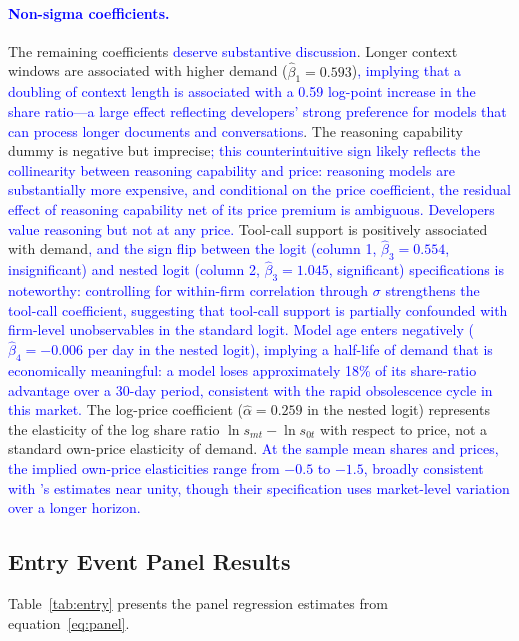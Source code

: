 \documentclass[11pt, a4paper]{article}
\begin{document}
\textcolor{blue}{\paragraph{Non-sigma coefficients.}} The remaining coefficients \textcolor{blue}{deserve substantive discussion}. Longer context windows are associated with higher demand ($\hat{\beta}_1 = 0.593$)\textcolor{blue}{, implying that a doubling of context length is associated with a 0.59 log-point increase in the share ratio---a large effect reflecting developers' strong preference for models that can process longer documents and conversations}. The reasoning capability dummy is negative but imprecise\textcolor{blue}{; this counterintuitive sign likely reflects the collinearity between reasoning capability and price: reasoning models are substantially more expensive, and conditional on the price coefficient, the residual effect of reasoning capability net of its price premium is ambiguous. Developers value reasoning but not at any price.} Tool-call support is positively associated with demand\textcolor{blue}{, and the sign flip between the logit (column 1, $\hat{\beta}_3 = 0.554$, insignificant) and nested logit (column 2, $\hat{\beta}_3 = 1.045$, significant) specifications is noteworthy: controlling for within-firm correlation through $\sigma$ strengthens the tool-call coefficient, suggesting that tool-call support is partially confounded with firm-level unobservables in the standard logit. Model age enters negatively ($\hat{\beta}_4 = -0.006$ per day in the nested logit), implying a half-life of demand that is economically meaningful: a model loses approximately 18\% of its share-ratio advantage over a 30-day period, consistent with the rapid obsolescence cycle in this market.} The log-price coefficient ($\hat{\alpha} = 0.259$ in the nested logit) represents the elasticity of the log share ratio $\ln s_{mt} - \ln s_{0t}$ with respect to price, not a standard own-price elasticity of demand. \textcolor{blue}{At the sample mean shares and prices, the implied own-price elasticities range from $-0.5$ to $-1.5$, broadly consistent with \citet{demirer2025emerging}'s estimates near unity, though their specification uses market-level variation over a longer horizon.}

\subsection{Entry Event Panel Results}

Table~\ref{tab:entry} presents the panel regression estimates from equation~\eqref{eq:panel}.
\end{document}
